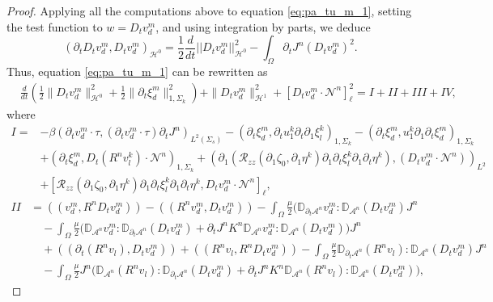 \documentclass[letterpaper,reqno,10pt,twoside]{amsart}
\theoremstyle{definition}
\theoremstyle{remark}
\def\p{\partial}
\def\Om{\Omega}
\begin{document}
\begin{proof}
		Applying all the computations above to equation \eqref{eq:pa_tu_m_1}, setting the test function to $w=D_{t}v_{d}^{m}$, and using integration by parts, we deduce
		\[
		(\partial_{t}D_{t}v_{d}^{m},D_{t}v_{d}^{m})_{\mathcal{H}^{0}}=\frac{1}{2}\frac{d}{dt}\vert \vert D_{t}v_{d}^{m}\vert \vert^{2}_{\mathcal{H}^{0}}-\int_{\Omega}\partial_{t}J^{n}(D_{t}v_{d}^{m})^{2}.
		\]
		\noindent Thus, equation \eqref{eq:pa_tu_m_1} can be rewritten as
		\begin{equation}\label{eq:e_2}
			\begin{aligned}
				&\frac{d}{dt}\left(\frac12\|D_{t}v_{d}^m\|_{\mathcal{H}^0}^2+\frac12\|\partial_{t}\xi_{d}^{m}\|_{1,\Sigma_{k}}^2\right)+\|D_tv_{d}^m\|_{\mathcal{H}^1}^2+[D_{t}v_{d}^{m}\cdot \mathcal{N}^{n}]_\ell^2=I+II+III+IV,
			\end{aligned}
		\end{equation}
		where
		\[
		\begin{aligned}
			I=&-\beta(\partial_{t}v_{d}^m\cdot\tau,(\partial_{t}v_{d}^{m}\cdot\tau)\p_tJ^{n})_{L^2(\Sigma_s)} -(\partial_{t}\xi_{d}^{m},\partial_{t}u_{1}^{k} \partial_{t}\partial_{1}\xi_{l}^{k})_{1,\Sigma_{k}}-(\partial_{t}\xi_{d}^{m}, u_{1}^{k}\partial_{1}\partial_{t}\xi_{d}^{m})_{1,\Sigma_{k}}\\
			&
			+(\p_{t}\xi_{d}^{m},D_{t}(R^{n}v_{l}^{k})\cdot \mathcal{N}^{n})_{1,\Sigma_{k}}+(\p_{1}(\mathcal{R}_{zz}(\p_{1}\zeta_{0},\p_{1}\eta^{k})\p_{1}\p_{t}\xi_{l}^{k}\p_{1}\p_{t}\eta^{k}),(D_{t}v_{d}^{m}\cdot \mathcal{N}^{n}))_{L^{2}}\\
			&+[\mathcal{R}_{zz}(\p_{1}\zeta_{0},\p_{1}\eta^{k})\p_{1}\p_{t}\xi_{l}^{k}\p_{1}\p_{t}\eta^{k},D_{t}v_{d}^{m}\cdot \mathcal{N}^{n}]_{\ell},
		\end{aligned}
		\]
		\[
		\begin{aligned}
			II&=((v_{d}^{m},R^{n}D_{t}v_{d}^{m}))-((R^{n}v_{d}^{m},D_{t}v_{d}^{m}))-\int_\Om\frac{\mu}{2}(\mathbb{D}_{\p_t\mathcal{A}^{n}}v_{d}^m:\mathbb{D}_{\mathcal{A}^{n}}(D_{t}v_{d}^{m})J^{n}\\
			&\quad-\int_\Om\frac{\mu}{2}\Big(\mathbb{D}_{\mathcal{A}^{n}}v_{d}^m:\mathbb{D}_{\p_t\mathcal{A}^{n}}(D_{t}v_{d}^{m})+\p_tJ^{n}K^{n}\mathbb{D}_{\mathcal{A}^{n}}v_{d}^m:\mathbb{D}_{\mathcal{A}^{n}}(D_{t}v_{d}^{m}) \Big)J^{n}\\
			&\quad+((\p_{t}(R^{n}v_{l}),D_{t}v_{d}^{m}))+((R^{n}v_{l},R^{n}D_{t}v_{d}^{m}))-\int_\Om\frac{\mu}{2}\mathbb{D}_{\p_t\mathcal{A}^{n}}(R^{n}v_{l}):\mathbb{D}_{\mathcal{A}^{n}}(D_{t}v_{d}^{m})J^{n}\\
			&
			\quad-\int_\Om\frac{\mu}{2}J^{n}\Big(\mathbb{D}_{\mathcal{A}^{n}}(R^{n}v_{l}):\mathbb{D}_{\p_t\mathcal{A}^{n}}(D_{t}v_{d}^{m})+\p_tJ^{n}K^{n}\mathbb{D}_{\mathcal{A}^{n}}(R^{n}v_{l}):\mathbb{D}_{\mathcal{A}^{n}}(D_{t}v_{d}^{m}) \Big),
		\end{aligned}
		\]
		

\end{proof}
\end{document}
